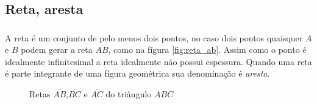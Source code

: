 \documentclass[handout]{beamer}
\begin{document}

\subsection{Reta, aresta}
\begin{frame}\frametitle{\subsecname}
    A reta é um conjunto de pelo menos dois pontos, no caso dois pontos quaisquer $A$ e $B$ podem gerar a reta $\overline{AB}$, como na fígura \ref{fig:reta_ab}.
    Assim como o ponto é idealmente infinitesimal a reta idealmente não possui espessura. Quando uma reta é parte
    integrante de uma fígura geométrica sua denominação é \textit{aresta}.

    \begin{figure}[H]
        \centering
        \caption{Retas $\overline{AB}$,$\overline{BC}$ e $\overline{AC}$ do triângulo $ABC$}
        \label{fig:tri_abc}
    \end{figure}
\end{frame}

\end{document}
